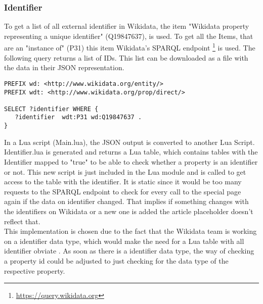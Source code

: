 \subsubsection{Identifier}

To get a list of all external identifier in Wikidata, the item "Wikidata property representing a unique identifier" (Q19847637), is used. To get all the Items, that are an "instance of" (P31) this item Wikidata's SPARQL endpoint \footnote{\href{https://query.wikidata.org}{https://query.wikidata.org}} is used. The following query returns a list of IDs. This list can be downloaded as a file with the data in their JSON representation. \\

\begin{lstlisting}[frame=single] 
PREFIX wd: <http://www.wikidata.org/entity/>
PREFIX wdt: <http://www.wikidata.org/prop/direct/>

SELECT ?identifier WHERE {
   ?identifier  wdt:P31 wd:Q19847637 . 
}
\end{lstlisting}

In a Lua script (Main.lua), the JSON output is converted to another Lua Script. Identifier.lua is generated and returns a Lua table, which contains tables with the Identifier mapped to "true" to be able to check whether a property is an identifier or not. This new script is just included in the Lua module and is called to get access to the table with the identifier. It is static since it would be too many requests to the SPARQL endpoint to check for every call to the special page again if the data on identifier changed. That implies if something changes with the identifiers on Wikidata or a new one is added the article placeholder doesn't reflect that. \\
This implementation is chosen due to the fact that the Wikidata team is working on a identifier data type, which would make the need for a Lua table with all identifier obviate . As soon as there is a identifier data type, the way of checking a property id could be adjusted to just checking for the data type of the respective property. 
